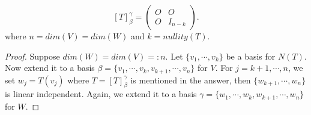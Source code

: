 \begin{Exercise}
\begin{answer}
$$
[T]_{\beta}^{\gamma} = \begin{pmatrix}
O & O \\
O & I_{n-k}
\end{pmatrix}.
$$
where $n=dim(V)=dim(W)$ and $k=nullity(T)$.
\end{answer}
\begin{proof}
Suppose $dim(W) = dim(V) =: n$. Let $\{v_1,\cdots,v_k\}$ be a basis for $N(T)$. Now extend it to a basis $\beta = \{v_1,\cdots,v_k,v_{k+1},\cdots,v_n\}$ for $V$. For $j=k+1,\cdots, n$, we set $w_j = T(v_j)$ where $T = [T]_{\beta}^{\gamma}$ is mentioned in the answer, then $\{w_{k+1},\cdots, w_n\}$ is linear independent. Again, we extend it to a basis $\gamma = \{w_1,\cdots, w_k,w_{k+1},\cdots,w_n\}$ for $W$.
\end{proof}
\end{Exercise}